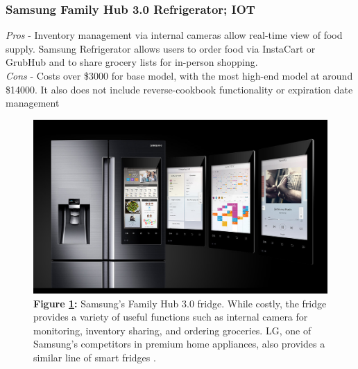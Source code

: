\documentclass{sigchi}
\begin{document}
	\subsubsection{\textbf{Samsung Family Hub 3.0 Refrigerator}; IOT}
		\textit{Pros} - Inventory management via internal cameras allow real-time view of food supply. Samsung Refrigerator allows users to order food via InstaCart or GrubHub and to share grocery lists for in-person shopping. \\
		\textit{Cons} - Costs over \$3000 for base model, with the most high-end model at around \$14000. It also does not include reverse-cookbook functionality or expiration date management
		\begin{figure}[htb!]
		\centering
			\includegraphics[width=0.8\columnwidth]{samsung_monster_fridge.png}\\
			\textbf{Figure \ref{fig:fridge}:} Samsung's Family Hub 3.0 fridge. While costly, the fridge provides a variety of useful functions such as internal camera for monitoring, inventory sharing, and ordering groceries. LG, one of Samsung's competitors in premium home appliances, also provides a similar line of smart fridges \cite{samsung}.
			\label{fig:fridge}
		\end{figure}
\end{document}
